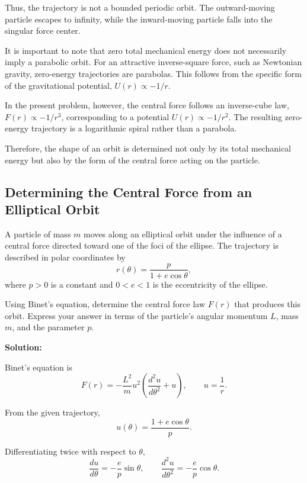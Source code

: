 \documentclass[12pt]{article}
\begin{document}
Thus, the trajectory is not a bounded periodic orbit.
The outward-moving particle escapes to infinity, while the
inward-moving particle falls into the singular force center.

It is important to note that zero total mechanical energy does
not necessarily imply a parabolic orbit. For an attractive
inverse-square force, such as Newtonian gravity, zero-energy
trajectories are parabolas. This follows from the specific form
of the gravitational potential, $U(r)\propto -1/r$.

In the present problem, however, the central force follows an
inverse-cube law, $F(r)\propto -1/r^3$, corresponding to a
potential $U(r)\propto -1/r^2$. The resulting zero-energy
trajectory is a logarithmic spiral rather than a parabola.

Therefore, the shape of an orbit is determined not only by
its total mechanical energy but also by the form of the
central force acting on the particle.




\subsection{Determining the Central Force from an Elliptical Orbit}

A particle of mass $m$ moves along an elliptical orbit under the
influence of a central force directed toward one of the foci of
the ellipse. The trajectory is described in polar coordinates by
\begin{equation}
    r(\theta)=\frac{p}{1+e\cos\theta},
\end{equation}
where $p>0$ is a constant and $0<e<1$ is the eccentricity of
the ellipse.

Using Binet's equation, determine the central force law $F(r)$
that produces this orbit. Express your answer in terms of the
particle's angular momentum $L$, mass $m$, and the parameter $p$.

\textbf{Solution:}

Binet's equation is
\begin{equation}
    F(r)=-\frac{L^2}{m}u^2
    \left(\frac{d^2u}{d\theta^2}+u\right),
    \qquad u=\frac{1}{r}.
\end{equation}

From the given trajectory,
\begin{equation}
    u(\theta)=\frac{1+e\cos\theta}{p}.
\end{equation}

Differentiating twice with respect to $\theta$,
\begin{equation}
    \frac{du}{d\theta}=-\frac{e}{p}\sin\theta,
    \qquad
    \frac{d^2u}{d\theta^2}=-\frac{e}{p}\cos\theta.
\end{equation}
\end{document}
